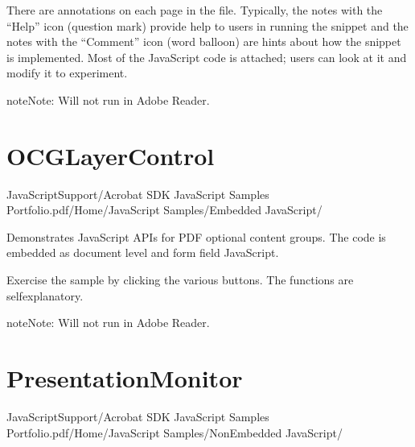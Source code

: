 \documentclass[letterpaper,12pt,english,openany,oneside]{sphinxmanual}
\begin{document}
There are annotations on each page in the file. Typically, the notes with the “Help” icon (question mark) provide help to users in running the snippet and the notes with the “Comment” icon (word balloon) are hints about how the snippet is implemented. Most of the JavaScript code is attached; users can look at it and modify it to experiment.

\begin{sphinxadmonition}{note}{Note:}
Will not run in Adobe Reader.
\end{sphinxadmonition}


\section{OCGLayerControl}
\label{\detokenize{Samples_JavaScript:ocglayercontrol}}\label{\detokenize{Samples_JavaScript:location-12}}

JavaScriptSupport/Acrobat SDK JavaScript Samples Portfolio.pdf/Home/JavaScript Samples/Embedded JavaScript/

\label{\detokenize{Samples_JavaScript:description-12}}

Demonstrates JavaScript APIs for PDF optional content groups. The code is embedded as document level and form field JavaScript.

\label{\detokenize{Samples_JavaScript:usage-5}}

Exercise the sample by clicking the various buttons. The functions are self\sphinxhyphen{}explanatory.

\begin{sphinxadmonition}{note}{Note:}
Will not run in Adobe Reader.
\end{sphinxadmonition}


\section{PresentationMonitor}
\label{\detokenize{Samples_JavaScript:presentationmonitor}}\label{\detokenize{Samples_JavaScript:location-13}}

JavaScriptSupport/Acrobat SDK JavaScript Samples Portfolio.pdf/Home/JavaScript Samples/Non\sphinxhyphen{}Embedded JavaScript/

\label{\detokenize{Samples_JavaScript:description-13}}
\end{document}
